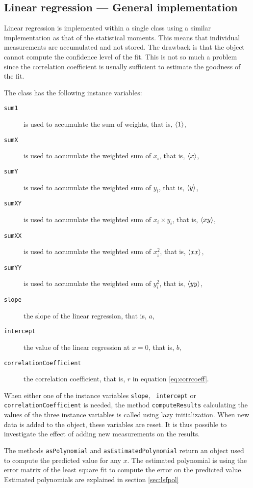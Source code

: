 \documentclass[twoside]{book}
\begin{document}
\subsection{Linear regression --- General  implementation}
 Linear regression is implemented within
a single class using a similar implementation as that of the
statistical moments. This means that individual measurements are
accumulated and not stored. The drawback is that the object cannot
compute the confidence level of the fit. This is not so much a
problem since the correlation coefficient is usually sufficient to
estimate the goodness of the fit.

\noindent The class has the following instance variables:
\begin{description}
  \item[\tt sum1] is used to accumulate the sum of weights, that
  is, $\left\langle 1\right\rangle$,
  \item[\tt sumX] is used to accumulate the weighted sum of $x_i$, that
  is, $\left\langle x\right\rangle$,
  \item[\tt sumY] is used to accumulate the weighted sum of $y_i$, that
  is, $\left\langle y\right\rangle$,
  \item[\tt sumXY] is used to accumulate the weighted sum of $x_i\times y_i$, that
  is, $\left\langle xy\right\rangle$,
  \item[\tt sumXX] is used to accumulate the weighted sum of $x_i^2$, that
  is, $\left\langle xx\right\rangle$,
  \item[\tt sumYY] is used to accumulate the weighted sum of $y_i^2$, that
  is, $\left\langle yy\right\rangle$,
  \item[\tt slope] the slope of the linear regression, that is,
  $a$,
  \item[\tt intercept] the value of the linear regression at $x=0$, that is,
  $b$,
  \item[\tt correlationCoefficient] the correlation coefficient, that is,
  $r$ in equation \ref{eq:corrcoeff}.
\end{description}
When either one of the instance variables {\tt slope}, {\tt
intercept} or {\tt correlationCoefficient} is needed, the method
{\tt computeResults} calculating the values of the three instance
variables is called using lazy initialization. When new data is
added to the object, these variables are reset. It is thus
possible to investigate the effect of adding new measurements on
the results.

The methods {\tt asPolynomial} and {\tt asEstimatedPolynomial}
return an object used to compute the predicted value for any $x$.
The estimated polynomial is using the error matrix of the least
square fit to compute the error on the predicted value. Estimated
polynomials are explained in section \ref{sec:lsfpol}
\end{document}
